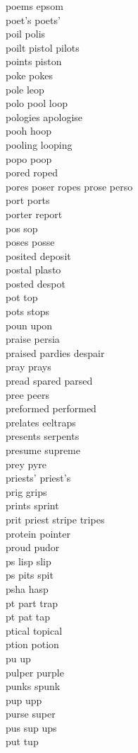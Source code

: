 poems epsom\\
poet's poets'\\
poil polis \\
poilt pistol pilots \\
points piston\\
poke pokes \\
pole leop\\
polo pool loop\\
pologies apologise \\
pooh hoop\\
pooling looping\\
popo poop\\
pored roped\\
pores poser ropes prose perso\\
port ports \\
porter report\\
pos sop\\
poses posse\\
posited deposit\\
postal plasto\\
posted despot\\
pot top\\
pots stops \\
poun upon\\
praise persia\\
praised pardies despair\\
pray prays \\
pread spared parsed \\
pree peers \\
preformed performed\\
prelates eeltraps\\
presents serpents\\
presume supreme\\
prey pyre\\
priests' priest's\\
prig grips \\
prints sprint\\
prit priest stripe tripes  \\
protein pointer\\
proud pudor\\
ps lisp slip  \\
ps pits spit  \\
psha hasp\\
pt part trap  \\
pt pat tap \\
ptical topical \\
ption potion \\
pu up\\
pulper purple\\
punks spunk\\
pup upp\\
purse super\\
pus sup ups\\
put tup\\

